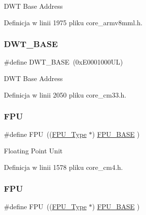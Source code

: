 D\+WT Base Address 

Definicja w linii 1975 pliku core\+\_\+armv8mml.\+h.

\mbox{\label{group___c_m_s_i_s__core__base_gafdab534f961bf8935eb456cb7700dcd2}} 
\subsubsection{\texorpdfstring{D\+W\+T\+\_\+\+B\+A\+SE}{DWT\_BASE}\hspace{0.1cm}{\footnotesize\ttfamily [8/8]}}
{\footnotesize\ttfamily \#define D\+W\+T\+\_\+\+B\+A\+SE~(0x\+E0001000\+U\+L)}

D\+WT Base Address 

Definicja w linii 2050 pliku core\+\_\+cm33.\+h.

\mbox{\label{group___c_m_s_i_s__core__base_gabc7c93f2594e85ece1e1a24f10591428}} 
\subsubsection{\texorpdfstring{F\+PU}{FPU}\hspace{0.1cm}{\footnotesize\ttfamily [1/4]}}
{\footnotesize\ttfamily \#define F\+PU~((\hyperlink{struct_f_p_u___type}{F\+P\+U\+\_\+\+Type}       $\ast$)     \hyperlink{group___c_m_s_i_s__core__base_ga4dcad4027118c098c07bcd575f1fbb28}{F\+P\+U\+\_\+\+B\+A\+SE}      )}

Floating Point Unit 

Definicja w linii 1578 pliku core\+\_\+cm4.\+h.

\mbox{\label{group___c_m_s_i_s__core__base_gabc7c93f2594e85ece1e1a24f10591428}} 
\subsubsection{\texorpdfstring{F\+PU}{FPU}\hspace{0.1cm}{\footnotesize\ttfamily [2/4]}}
{\footnotesize\ttfamily \#define F\+PU~((\hyperlink{struct_f_p_u___type}{F\+P\+U\+\_\+\+Type}       $\ast$)     \hyperlink{group___c_m_s_i_s__core__base_ga4dcad4027118c098c07bcd575f1fbb28}{F\+P\+U\+\_\+\+B\+A\+SE}      )}

